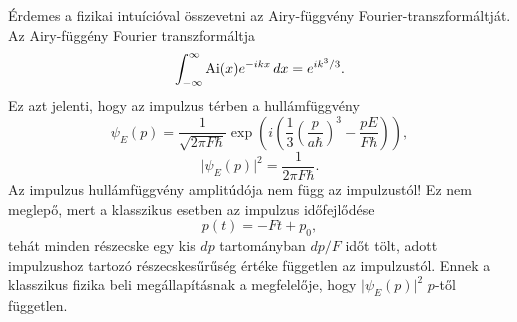 Érdemes a fizikai intuícióval összevetni az Airy-függvény Fourier-transzformáltját. Az Airy-függény Fourier transzformáltja
\begin{equation}
	\int_{-\infty}^\infty\operatorname{Ai}(x)e^{-ikx}\,dx=e^{ik^3/3}.
\end{equation}
Ez azt jelenti, hogy az impulzus térben a hullámfüggvény
\begin{equation}
	\psi_E(p)=\frac{1}{\sqrt{2\pi F\hbar}}\exp\left(i\left(\frac{1}{3}\left(\frac{p}{a\hbar}\right)^3-\frac{pE}{F\hbar}\right)\right),
\end{equation}
\begin{equation}
	\rvert\psi_E(p)\lvert^2=\frac{1}{2\pi F\hbar}.
\end{equation}
Az impulzus hullámfüggvény amplitúdója nem függ az impulzustól! Ez nem meglepő, mert a klasszikus esetben az impulzus időfejlődése 
\begin{equation}
	p(t)=-Ft+p_0,
\end{equation}
tehát minden részecske egy kis $dp$ tartományban $dp/F$ időt tölt, adott impulzushoz tartozó részecskesűrűség értéke független az impulzustól. Ennek a klasszikus fizika beli megállapításnak a megfelelője, hogy $\lvert\psi_E(p)\rvert^2$ $p$-től független.






